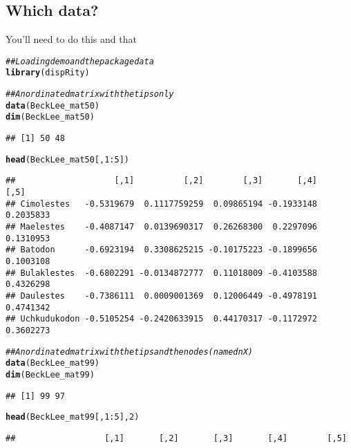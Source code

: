 \documentclass{article}\usepackage[]{graphicx}\usepackage[]{color}
\makeatletter
\newcommand{\hlnum}[1]{\textcolor[rgb]{0.686,0.059,0.569}{#1}}%
\newcommand{\hlcom}[1]{\textcolor[rgb]{0.678,0.584,0.686}{\textit{#1}}}%
\newcommand{\hlopt}[1]{\textcolor[rgb]{0,0,0}{#1}}%
\newcommand{\hlstd}[1]{\textcolor[rgb]{0.345,0.345,0.345}{#1}}%
\newcommand{\hlkwd}[1]{\textcolor[rgb]{0.737,0.353,0.396}{\textbf{#1}}}%
\newenvironment{kframe}{%
 \def\at@end@of@kframe{}%
 \ifinner\ifhmode%
  \def\at@end@of@kframe{\end{minipage}}%
  \begin{minipage}{\columnwidth}%
 \fi\fi%
 \def\FrameCommand##1{\hskip\@totalleftmargin \hskip-\fboxsep
 \colorbox{shadecolor}{##1}\hskip-\fboxsep
     \hskip-\linewidth \hskip-\@totalleftmargin \hskip\columnwidth}%
 \MakeFramed {\advance\hsize-\width
   \@totalleftmargin\z@ \linewidth\hsize
   \@setminipage}}%
 {\par\unskip\endMakeFramed%
 \at@end@of@kframe}
\newenvironment{knitrout}{}{} %
\makeatother
\begin{document}
\subsection{Which data?}
You'll need to do this and that

\begin{knitrout}
\color{fgcolor}\begin{kframe}
\begin{alltt}
\hlcom{## Loading demo and the package data}
\hlkwd{library}\hlstd{(dispRity)}
\end{alltt}


{\ttfamily\noindent\itshape\color{messagecolor}{\#\# Loading required package: paleotree}}\begin{alltt}
\hlcom{## An ordinated matrix with the tips only}
\hlkwd{data}\hlstd{(BeckLee_mat50)}
\hlkwd{dim}\hlstd{(BeckLee_mat50)}
\end{alltt}
\begin{verbatim}
## [1] 50 48
\end{verbatim}
\begin{alltt}
\hlkwd{head}\hlstd{(BeckLee_mat50[,}\hlnum{1}\hlopt{:}\hlnum{5}\hlstd{])}
\end{alltt}
\begin{verbatim}
##                    [,1]          [,2]        [,3]       [,4]      [,5]
## Cimolestes   -0.5319679  0.1117759259  0.09865194 -0.1933148 0.2035833
## Maelestes    -0.4087147  0.0139690317  0.26268300  0.2297096 0.1310953
## Batodon      -0.6923194  0.3308625215 -0.10175223 -0.1899656 0.1003108
## Bulaklestes  -0.6802291 -0.0134872777  0.11018009 -0.4103588 0.4326298
## Daulestes    -0.7386111  0.0009001369  0.12006449 -0.4978191 0.4741342
## Uchkudukodon -0.5105254 -0.2420633915  0.44170317 -0.1172972 0.3602273
\end{verbatim}
\begin{alltt}
\hlcom{## An ordinated matrix with the tips and the nodes (named nX)}
\hlkwd{data}\hlstd{(BeckLee_mat99)}
\hlkwd{dim}\hlstd{(BeckLee_mat99)}
\end{alltt}
\begin{verbatim}
## [1] 99 97
\end{verbatim}
\begin{alltt}
\hlkwd{head}\hlstd{(BeckLee_mat99[,}\hlnum{1}\hlopt{:}\hlnum{5}\hlstd{],} \hlnum{2}\hlstd{)}
\end{alltt}
\begin{verbatim}
##                  [,1]       [,2]       [,3]       [,4]        [,5]

\end{verbatim}
\end{kframe}
\end{knitrout}
\end{document}
